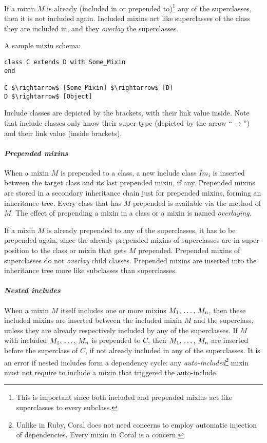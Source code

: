 If a mixin $M$ is already (included in or prepended to)\footnote{This is important since both included and prepended mixins act like superclasses to every subclass.} any of the superclasses, then it is not included again. Included mixins act like superclasses of the class they are included in, and they {\em overlay} the superclasses. 

\example A sample mixin schema:
\begin{lstlisting}
class C extends D with Some_Mixin
end

C $\rightarrow$ [Some_Mixin] $\rightarrow$ [D]
D $\rightarrow$ [Object]
\end{lstlisting}
Include classes are depicted by the brackets, with their link value inside. Note that include classes only know their super-type (depicted by the arrow ``$\rightarrow$'') and their link value (inside brackets). 

\paragraph{\em Prepended mixins}
When a mixin $M$ is prepended to a class, a new include class $Im_i$ is inserted between the target class and its last prepended mixin, if any. Prepended mixins are stored in a secondary inheritance chain just for prepended mixins, forming an inheritance tree. Every class that has $M$ prepended is available via the  method of $M$. The effect of prepending a mixin in a class or a mixin is named {\em overlaying}. 

If a mixin $M$ is already prepended to any of the superclasses, it has to be prepended again, since the already prepended mixins of superclasses are in super-position to the class or mixin that gets $M$ prepended. Prepended mixins of superclasses do not {\em overlay} child classes. Prepended mixins are inserted into the inheritance tree more like subclasses than superclasses. 

\paragraph{\em Nested includes}
When a mixin $M$ itself includes one or more mixins $M_1 ,\, \ldots ,\, M_n$, then these included mixins are inserted between the included mixin $M$ and the superclass, unless they are already respectively included by any of the superclasses. If $M$ with included $M_1 ,\, \ldots ,\, M_n$ is prepended to $C$, then $M_1 ,\, \ldots ,\, M_n$ are inserted before the superclass of $C$, if not already included in any of the superclasses. It is an error if nested includes form a dependency cycle: any {\em auto-included}\footnote{Unlike in Ruby, Coral does not need concerns to employ automatic injection of dependencies. Every mixin in Coral is a concern.} mixin must not require to include a mixin that triggered the auto-include. 

